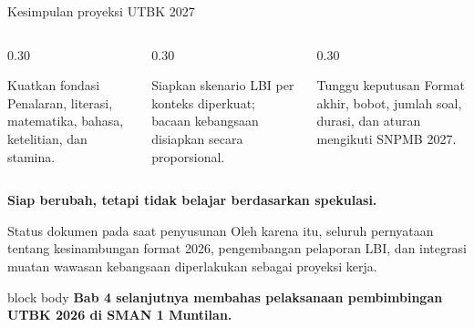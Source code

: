 \begin{frame}{Kesimpulan proyeksi UTBK 2027}
  \begin{columns}[T,onlytextwidth]
    \begin{column}{0.30\textwidth}
      \begin{block}{Kuatkan fondasi}
        Penalaran, literasi, matematika, bahasa, ketelitian, dan stamina.
      \end{block}
    \end{column}
    \begin{column}{0.30\textwidth}
      \begin{block}{Siapkan skenario}
        LBI per konteks diperkuat; bacaan kebangsaan disiapkan secara proporsional.
      \end{block}
    \end{column}
    \begin{column}{0.30\textwidth}
      \begin{block}{Tunggu keputusan}
        Format akhir, bobot, jumlah soal, durasi, dan aturan mengikuti SNPMB 2027.
      \end{block}
    \end{column}
  \end{columns}
  \vspace{0.30cm}
  \centering
  {\color{StudentNavy}\bfseries\fontsize{15}{18}\selectfont Siap berubah, tetapi tidak belajar berdasarkan spekulasi.}
\end{frame}

\begin{frame}{Status dokumen pada saat penyusunan}
  \vspace{0.30cm}
  {\fontsize{11.5}{14.5}\selectfont
  Oleh karena itu, seluruh pernyataan tentang kesinambungan format 2026, pengembangan pelaporan LBI, dan integrasi muatan wawasan kebangsaan diperlakukan sebagai proyeksi kerja.}
  \vspace{0.28cm}
  \begin{beamercolorbox}[rounded=true,sep=0.20cm,wd=\textwidth]{block body}
    \centering\bfseries Bab 4 selanjutnya membahas pelaksanaan pembimbingan UTBK 2026 di SMAN 1 Muntilan.
  \end{beamercolorbox}
\end{frame}
